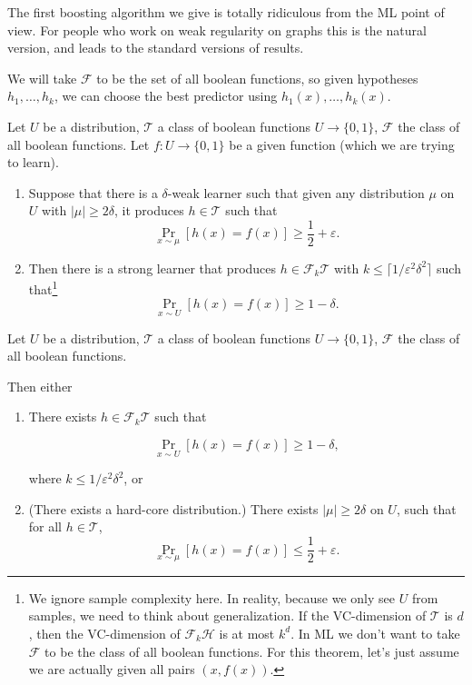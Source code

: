 
The first boosting algorithm we give is totally ridiculous from the ML point of view. For people who work on weak regularity on graphs this is the natural version, and leads to the standard versions of results.

We will take $\mathcal F$ to be the set of all boolean functions, so given hypotheses $h_1,\ldots, h_k$, we can choose the best predictor using $h_1(x),\ldots, h_k(x)$.

\begin{thm}\label{thm:boosting}
Let $U$ be a distribution, $\mathcal T$ a class of boolean functions $U\to \{0,1\}$,  $\mathcal F$ the class of all boolean functions. 
Let $f:U\to \{0,1\}$ be a given function (which we are trying to learn).

\begin{enumerate}
\item
Suppose that there is a $\delta$-weak learner such that given any distribution $\mu$ on $U$ with $|\mu|\ge 2\delta$, it produces $h\in \mathcal T$ such that 
$$
\Pr_{x\sim \mu} [h(x) = f(x)] \ge \frac{1}{2}+ \varepsilon.
$$
\item
Then there is a strong learner that produces $h\in \mathcal F_k\mathcal T$ with $k\le\lceil 1/\varepsilon^2\delta^2\rceil$ such that\footnote{
We ignore sample complexity here. In reality, because we only see $U$ from samples, we need to think about generalization. If the VC-dimension of $\mathcal T$ is $d$, then the VC-dimension of $\mathcal F_k\mathcal H$ is at most $k^d$. In ML we don't want to take $\mathcal F$ to be the class of all boolean functions. For this theorem, let's just assume we are actually given all pairs $(x,f(x))$.
}
$$
\Pr_{x\sim U} [h(x) = f(x)]\ge 1-\delta.
$$
\end{enumerate}
\end{thm}

\begin{thm}
\label{thm:hardcore}
Let $U$ be a distribution, $\mathcal T$ a class of boolean functions $U\to \{0,1\}$, $\mathcal F$ the class of all boolean functions.

Then either
\begin{enumerate}
\item %
There exists $h\in \mathcal F_k \mathcal T$ such that 

$$
\Pr_{x\sim U} [h(x)=f(x)] \ge 1-\delta,
$$

where $k \le 1/\varepsilon^2\delta^2$, or
\item (There exists a hard-core distribution.)
There exists $|\mu|\ge 2\delta$ on $U$, such that for all $h\in \mathcal T$, 
$$
\Pr_{x\sim \mu}[h(x) = f(x)] \le \frac{1}{2}+\varepsilon.
$$
\end{enumerate}
\end{thm}

